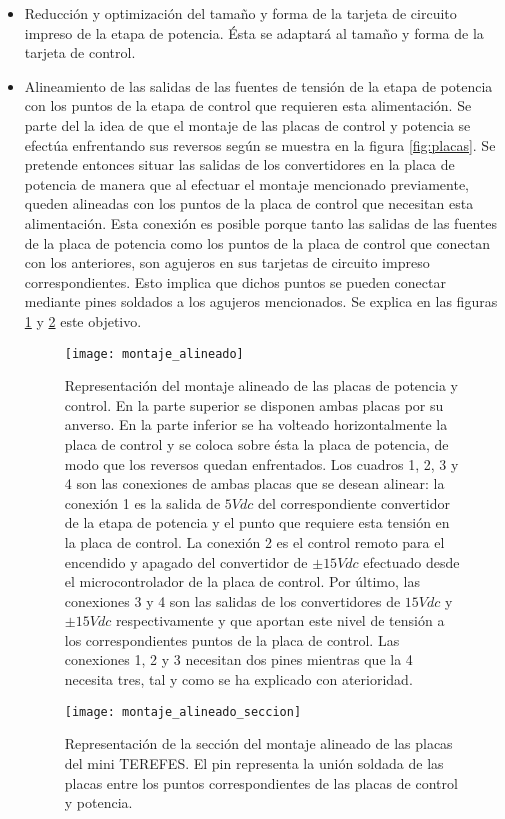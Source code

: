 \begin{itemize}
\item[\textbf{1)}] Reducción y optimización del tamaño y forma de la tarjeta de circuito impreso de la etapa de potencia. Ésta se adaptará al tamaño y forma de la tarjeta de control.
\item[\textbf{2)}] Alineamiento de las salidas de las fuentes de tensión de la etapa de potencia con los puntos de la etapa de control que requieren esta alimentación. Se parte del la idea de que el montaje de las placas de control y potencia se efectúa enfrentando sus reversos según se muestra en la figura \ref{fig:placas}. Se pretende entonces situar las salidas de los convertidores en la placa de potencia de manera que al efectuar el montaje mencionado previamente, queden alineadas con los puntos de la placa de control que necesitan esta alimentación. Esta conexión es posible porque tanto las salidas de las fuentes de la placa de potencia como los puntos de la placa de control que conectan con los anteriores, son agujeros en sus tarjetas de circuito impreso correspondientes. Esto implica que dichos puntos se pueden conectar mediante pines soldados a los agujeros mencionados. Se explica en las figuras \ref{fig:montaje_alineado} y \ref{fig:montaje_alineado_seccion} este objetivo.\\

\begin{figure}[!htb]
\centering
\texttt{[image: montaje\_alineado]}
  \caption{Representación del montaje alineado de las placas de potencia y control. En la parte superior se disponen ambas placas por su anverso. En la parte inferior se ha volteado horizontalmente la placa de control y se coloca sobre ésta la placa de potencia, de modo que los reversos quedan enfrentados. Los cuadros 1, 2, 3 y 4 son las conexiones de ambas placas que se desean alinear: la conexión 1 es la salida de $5Vdc$ del correspondiente convertidor de la etapa de potencia y el punto que requiere esta tensión en la placa de control. La conexión 2 es el control remoto para el encendido y apagado del convertidor de $\pm15Vdc$ efectuado desde el microcontrolador de la placa de control. Por último, las conexiones 3 y 4 son las salidas de los convertidores de $15Vdc$ y $\pm15Vdc$ respectivamente y que aportan este nivel de tensión a los correspondientes puntos de la placa de control. Las conexiones 1, 2 y 3 necesitan dos pines mientras que la 4 necesita tres, tal y como se ha explicado con aterioridad.}\label{fig:montaje_alineado}
\end{figure}

\begin{figure}[!htb]
\centering
\texttt{[image: montaje\_alineado\_seccion]}
  \caption{Representación de la sección del montaje alineado de las placas del mini TEREFES. El pin representa la unión soldada de las placas entre los puntos correspondientes de las placas de control y potencia.}\label{fig:montaje_alineado_seccion}
\end{figure}

\end{itemize}

